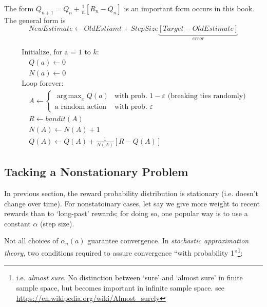 \documentclass[lang=en,mode=geye,device=normal,color=blue,14pt]{elegantnote}
\DeclareMathOperator*{\1}{\mathbbm{1}}
\DeclareMathOperator*{\argmax}{arg\,max}
\begin{document}
The form $Q_{n+1} = Q_n + \frac{1}{n}[R_n - Q_n]$ is an important form occurs in this book. The general form is
$$ NewEstimate \leftarrow OldEstiamt + StepSize\underbrace{[Target - OldEstimate]}_{error} $$

\begin{tcolorbox}[width=\textwidth,title={A simple bandit algorithm}]
	\begin{align*}
	   & \text{Initialize, for a = 1 to }k: \\
	   & \quad Q(a) \leftarrow 0 \\
	   & \quad N(a) \leftarrow 0 \\
	   & \text{Loop forever: }\\
	   & \quad A \leftarrow \left\{
	    \begin{array}{ll}
	        \argmax_x Q(a) & \text{with prob. } 1 - \varepsilon \text{ (breaking ties randomly) }\\
	        \text{a random action} & \text{with prob. } \varepsilon
	    \end{array}
	\right. \\
	   & \quad R \leftarrow bandit(A) \\
	   & \quad N(A) \leftarrow N(A) + 1 \\
	   & \quad Q(A) \leftarrow Q(A) + \frac{1}{N(A)}[R-Q(A)]
	\end{align*}
\end{tcolorbox}

\subsection{Tacking a Nonstationary Problem}

In previous section, the reward probability distribution is stationary (i.e. doesn't change over time).
For nonstatoinary cases, let say we give more weight to recent rewards than to `long-past' rewards; for doing so, one popular way is to use a constant $\alpha$ (step size).

Not all choices of $\alpha_n(a)$ guarantee convergence.
In \textit{stochastic approximation theory}, two conditions required to assure convergence ``with probability 1''\footnote{i.e. \textit{almost sure}. No distinction between `sure' and `almost sure' in finite sample space, but becomes important in infinite sample space. see \url{https://en.wikipedia.org/wiki/Almost_surely}}:
\end{document}
